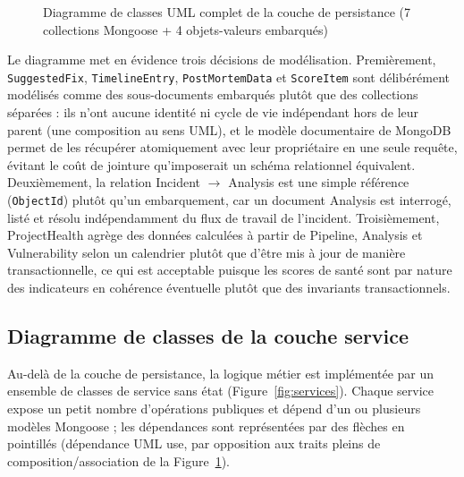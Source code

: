 \documentclass[12pt,a4paper,oneside]{report}
\begin{document}
\begin{figure}[H]
\caption{Diagramme de classes UML complet de la couche de persistance (7 collections Mongoose + 4 objets-valeurs embarqués)}\label{fig:classdiagram}
\end{figure}

Le diagramme met en évidence trois décisions de modélisation. Premièrement, \texttt{SuggestedFix}, \texttt{TimelineEntry}, \texttt{PostMortemData} et \texttt{ScoreItem} sont délibérément modélisés comme des sous-documents embarqués plutôt que des collections séparées : ils n'ont aucune identité ni cycle de vie indépendant hors de leur parent (une composition au sens UML), et le modèle documentaire de MongoDB permet de les récupérer atomiquement avec leur propriétaire en une seule requête, évitant le coût de jointure qu'imposerait un schéma relationnel équivalent. Deuxièmement, la relation Incident $\rightarrow$ Analysis est une simple référence (\texttt{ObjectId}) plutôt qu'un embarquement, car un document Analysis est interrogé, listé et résolu indépendamment du flux de travail de l'incident. Troisièmement, ProjectHealth agrège des données calculées à partir de Pipeline, Analysis et Vulnerability selon un calendrier plutôt que d'être mis à jour de manière transactionnelle, ce qui est acceptable puisque les scores de santé sont par nature des indicateurs en cohérence éventuelle plutôt que des invariants transactionnels.

\subsection{Diagramme de classes de la couche service}
Au-delà de la couche de persistance, la logique métier est implémentée par un ensemble de classes de service sans état (Figure~\ref{fig:services}). Chaque service expose un petit nombre d'opérations publiques et dépend d'un ou plusieurs modèles Mongoose ; les dépendances sont représentées par des flèches en pointillés (dépendance UML \guillemotleft use\guillemotright, par opposition aux traits pleins de composition/association de la Figure~\ref{fig:classdiagram}).
\end{document}
